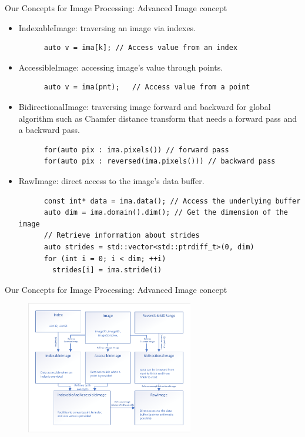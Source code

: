 \documentclass[12pt,aspectratio=169]{beamer}
\begin{document}
\begin{frame}[fragile]{Our Concepts for Image Processing: Advanced Image concept}
  \begin{itemize}
    \item IndexableImage: traversing an image via indexes.
          \begin{verbatim}
      auto v = ima[k]; // Access value from an index
    \end{verbatim}
    \item AccessibleImage: accessing image's value through points.
          \begin{verbatim}
      auto v = ima(pnt);   // Access value from a point
    \end{verbatim}
    \item BidirectionalImage: traversing image forward and backward for global algorithm such as Chamfer distance
          transform that needs a forward pass and a backward pass.
          \begin{verbatim}
      for(auto pix : ima.pixels()) // forward pass
      for(auto pix : reversed(ima.pixels())) // backward pass
    \end{verbatim}
    \item RawImage: direct access to the image's data buffer.
          \begin{verbatim}
      const int* data = ima.data(); // Access the underlying buffer
      auto dim = ima.domain().dim(); // Get the dimension of the image
      // Retrieve information about strides
      auto strides = std::vector<std::ptrdiff_t>(0, dim)
      for (int i = 0; i < dim; ++i)
        strides[i] = ima.stride(i)
      \end{verbatim}
  \end{itemize}
\end{frame}

\begin{frame}[fragile]{Our Concepts for Image Processing: Advanced Image concept}
  \centering
  \begin{figure}
    \includegraphics[width=0.65\textwidth]{../figures/concepts/images_all}
  \end{figure}
\end{frame}
\end{document}
